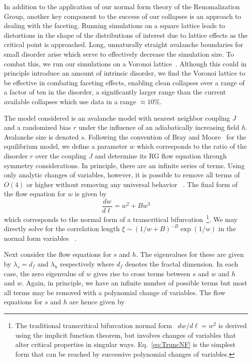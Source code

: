 \documentclass[reprint,amsmath,amssymb,aps,floatfix, prl]{revtex4-1}
\begin{document}
%
In addition to the application of our normal form theory of the Renomalization Group, another key component to the success of our collapses is an approach to dealing with the faceting. Running simulations on a square lattice leads to distortions in the shape of the distributions of interest due to lattice effects as the critical point is approached. Long, unnaturally straight avalanche boundaries for small disorder arise which serve to effectively decrease the simulation size. To combat this, we run our simulations on a Voronoi lattice~\cite[Section~\ref{supp-app:sims}]{RFIM2Dsupp}.  Although this could in principle introduce an amount of intrinsic disorder, we find the Voronoi lattice to be effective in combating faceting effects, enabling clean collapses over a range of a factor of ten in the disorder, a significantly larger range than the current available collapses which use data in a range $\approx 10\%$.\par
%
The model considered is an avalanche model with nearest neighbor coupling $J$ and a randomized bias $r$ under the influence of an adiabatically increasing field $h$. Avalanche size is denoted $s$. Following the convention of Bray and Moore~\cite{BrayMoore85} for the equilibrium model, we define a parameter $w$ which corresponds to the ratio of the disorder $r$ over the coupling $J$ and determine its RG flow equation through symmetry considerations. In principle, there are an infinite series of terms. Using only analytic changes of variables, however, it is possible to remove all terms of $O(4)$ or higher without removing any universal behavior ~\cite[Section~\ref{supp-app:normalform}]{RFIM2Dsupp}. The final form of the flow equation for $w$ is given by 
%
\begin{equation}
	\label{eq:TruncNF}
	\frac{dw}{d\ell}=w^2+B w^3
\end{equation}
\noindent which corresponds to the normal form of a transcritical bifurcation~\footnote{The traditional transcritical bifurcation normal form~\cite{Strogatz14} $dw/d\ell = w^2$ is derived using the implicit function theorem, but involves changes of variables that alter critical properties in singular ways. Eq.~\ref{eq:TruncNF} is the simplest form that can be reached by successive polynomial changes of variables.}. We may directly solve for the correlation length $\xi\sim(1/w + B)^{-B}\exp(1/w)$ in the normal form variables ~\cite[Section~\ref{supp-app:correlation}]{RFIM2Dsupp}.\par
%
Next consider the flow equations for $s$ and $h$. The eigenvalues for these are given by $\lambda_s=d_f$ and $\lambda_h$ respectively where $d_f$ denotes the fractal dimension. In each case, the zero eigenvalue of $w$ gives rise to cross terms between $s$ and $w$ and $h$ and $w$. Again, in principle, we have an infinite number of possible terms but most all terms may be removed with a polynomial change of variables.   The flow equations for $s$ and $h$ are hence given by
\end{document}
